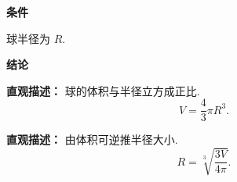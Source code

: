 \begin{statementbox}

	\textbf{\textcolor{CStatement}{条件}}
	\begin{description}[style=nextline, leftmargin=2.8em, labelsep=0.5em, itemsep=0.35em]
		\item[\textbf{\textcolor{CStatement}{条件 1（球半径已知）：}}] 球半径为 $R$.
	\end{description}

	\textbf{\textcolor{CStatement}{结论}}
	\begin{description}[style=nextline, leftmargin=2.8em, labelsep=0.5em, itemsep=0.45em]
		\item[\textbf{\textcolor{CStatement}{结论一（球的体积公式）：}}]
			\textbf{\textcolor{CStatement}{直观描述：}}
			球的体积与半径立方成正比.
			\[
				V = \frac{4}{3}\pi R^3.
			\]

		\item[\textbf{\textcolor{CStatement}{常见变形（已知体积求半径）：}}]
			\textbf{\textcolor{CStatement}{直观描述：}}
			由体积可逆推半径大小.
			\[
				R = \sqrt[3]{\frac{3V}{4\pi}}.
			\]
	\end{description}

\end{statementbox}

